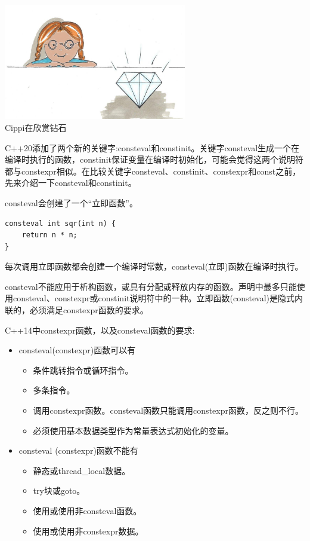\begin{center}
\includegraphics[width=0.6\textwidth]{content/3/chapter4/images/36.png}\\
Cippi在欣赏钻石
\end{center}

C++20添加了两个新的关键字:consteval和constinit。关键字consteval生成一个在编译时执行的函数，constinit保证变量在编译时初始化，可能会觉得这两个说明符都与constexpr相似。在比较关键字consteval、constinit、constexpr和const之前，先来介绍一下consteval和constinit。


consteval会创建了一个“立即函数”。

\begin{lstlisting}[style=styleCXX]
consteval int sqr(int n) {
	return n * n;
}
\end{lstlisting}

每次调用立即函数都会创建一个编译时常数，consteval(立即)函数在编译时执行。

consteval不能应用于析构函数，或具有分配或释放内存的函数。声明中最多只能使用consteval、constexpr或constinit说明符中的一种。立即函数(consteval)是隐式内联的，必须满足constexpr函数的要求。

C++14中constexpr函数，以及consteval函数的要求:

\begin{itemize}
\item 
consteval(constexpr)函数可以有
\begin{itemize}
\item 
条件跳转指令或循环指令。

\item 
多条指令。

\item 
调用constexpr函数。consteval函数只能调用constexpr函数，反之则不行。

\item 
必须使用基本数据类型作为常量表达式初始化的变量。
\end{itemize}

\item 
consteval (constexpr)函数不能有
\begin{itemize}
\item 
静态或thread\_local数据。

\item 
try块或goto。

\item 
使用或使用非consteval函数。

\item 
使用或使用非constexpr数据。
\end{itemize}
\end{itemize}

